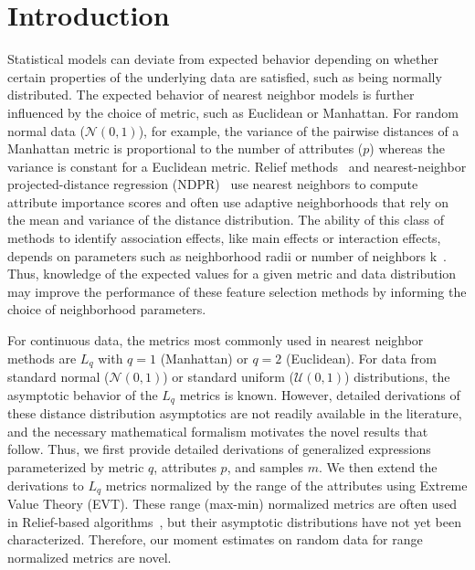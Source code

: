 \documentclass[10pt,letterpaper]{article}
\begin{document}
\linenumbers

\section*{Introduction}
Statistical models can deviate from expected behavior depending on whether certain properties of the underlying data are satisfied, such as being normally distributed. The expected behavior of nearest neighbor models is further influenced by the choice of metric, such as Euclidean or Manhattan. For random normal data ($\mathcal{N}(0,1)$), for example, the variance of the pairwise distances of a Manhattan metric is proportional to the number of attributes ($p$) whereas the variance is constant for a Euclidean metric. Relief methods~\cite{urbanowicz17,urbanowicz17b,robnik2003} and nearest-neighbor projected-distance regression (NDPR)~\cite{npdr2} use nearest neighbors to compute attribute importance scores and often use adaptive neighborhoods that rely on the mean and variance of the distance distribution. The ability of this class of methods to identify association effects, like main effects or interaction effects, depends on parameters such as neighborhood radii or number of neighbors k~\cite{stir,mckinney13}. Thus, knowledge of the expected values for a given metric and data distribution may improve the performance of these feature selection methods by informing the choice of neighborhood parameters. 

For continuous data, the metrics most commonly used in nearest neighbor methods are $L_q$ with $q=1$ (Manhattan) or $q=2$ (Euclidean). For data from standard normal ($\mathcal{N}(0,1)$) or standard uniform ($\mathcal{U}(0,1)$) distributions, the asymptotic behavior of the $L_q$ metrics is known. However, detailed derivations of these distance distribution asymptotics are not readily available in the literature, and the necessary mathematical formalism motivates the novel results that follow. Thus, we first provide detailed derivations of generalized expressions parameterized by metric $q$, attributes $p$, and samples $m$. We then extend the derivations to $L_q$ metrics normalized by the range of the attributes using Extreme Value Theory (EVT). These range (max-min) normalized metrics are often used in Relief-based algorithms~\cite{robnik2003}, but their asymptotic distributions have not yet been characterized. Therefore, our moment estimates on random data for range normalized metrics are novel.
\end{document}
